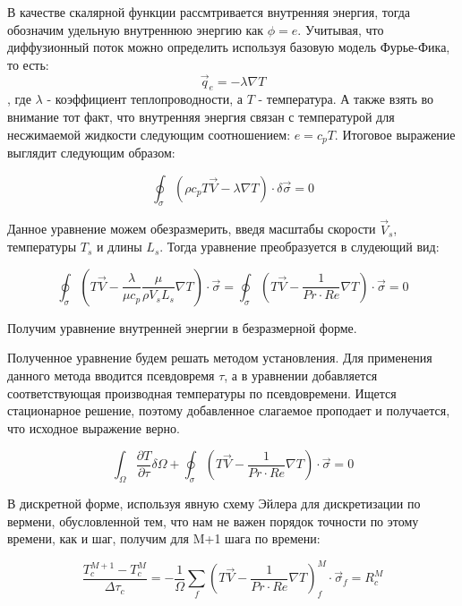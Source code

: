 В качестве скалярной функции рассмтривается внутренняя энергия, тогда обозначим удельную внутреннюю энергию как $\phi=e$. Учитывая, что диффузионный поток можно определить используя базовую модель Фурье-Фика, то есть:
\begin{equation}
    \vec{q}_e = -\lambda\nabla T
\end{equation}
, где $\lambda$ - коэффициент теплопроводности, а $T$ - температура. А также взять во внимание тот факт, что внутренняя энергия связан с температурой для несжимаемой жидкости следующим соотношением: $e=c_pT$. Итоговое выражение выглядит следующим образом:

\begin{equation}
    \oint_\sigma (\rho c_pT\vec{V}-\lambda\nabla T)\cdot\delta\vec{\sigma}=0
\end{equation}

Данное уравнение можем обезразмерить, введя масштабы скорости $\vec{V}_s$, температуры $T_s$ и длины $L_s$. Тогда уравнение преобразуется в слудеющий вид:

\begin{equation}
    \oint_\sigma(T\vec{V}-\frac{\lambda}{\mu c_p}\frac{\mu}{\rho V_s L_s}\nabla T)\cdot\vec{\sigma} = \oint_\sigma(T\vec{V}-\frac{1}{Pr \cdot Re}\nabla T)\cdot\vec{\sigma} =0
\end{equation}

Получим уравнение внутренней энергии в безразмерной форме.

Полученное уравнение будем решать методом установления. Для применения
данного метода вводится псевдовремя $\tau$, а в уравнении добавляется соответствующая производная температуры по псевдовремени. Ищется стационарное решение, поэтому добавленное слагаемое проподает и получается, что исходное выражение верно.

\begin{equation}
    \int_\Omega \frac{\partial T}{\partial \tau}\delta\Omega+\oint_\sigma(T\vec{V}-\frac{1}{Pr \cdot Re}\nabla T)\cdot\vec{\sigma} =0
\end{equation}

В дискретной форме, используя явную схему Эйлера для дискретизации по вермени, обусловленной тем, что нам не важен порядок точности по этому времени, как и шаг, получим для M+1 шага по времени:

\begin{equation}
    \frac{T^{M+1}_c-T^M_c}{\Delta\tau_c} = - \frac{1}{\Omega}\sum_f(T\vec{V}-\frac{1}{Pr\cdot Re}\nabla T)^M_f\cdot\vec{\sigma}_f=R^M_c
\end{equation}

